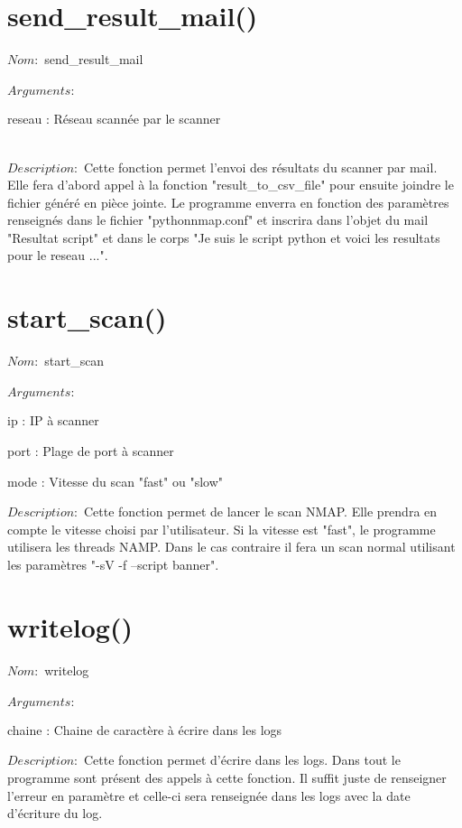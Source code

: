 \documentclass[12pt]{report}
\begin{document}
		\section{send\_result\_mail()}
			{\setlength{\parindent}{0cm}
			$Nom :$ send\_result\_mail\\\\
			}
			$Arguments :$
			\begin{description}
				\item reseau : Réseau scannée par le scanner\\\
			\end{description}
			$Description : $ Cette fonction permet l'envoi des résultats du scanner par mail. Elle fera d'abord appel à la fonction "result\_to\_csv\_file" pour ensuite joindre le fichier généré en pièce jointe. Le programme enverra en fonction des paramètres renseignés dans le fichier "pythonnmap.conf" et inscrira dans l'objet du mail "Resultat script" et dans le corps "Je suis le script python et voici les resultats pour le reseau ...".
		\section{start\_scan()}
			{\setlength{\parindent}{0cm}
			$Nom :$ start\_scan\\\\
			}
			$Arguments :$
			\begin{description}
				\item ip : IP à scanner
				\item port : Plage de port à scanner
				\item mode : Vitesse du scan "fast" ou "slow"\\
			\end{description}
			$Description : $ Cette fonction permet de lancer le scan NMAP. Elle prendra en compte le vitesse choisi par l'utilisateur. Si la vitesse est "fast", le programme utilisera les threads NAMP. Dans le cas contraire il fera un scan normal utilisant les paramètres "-sV -f --script banner".
		\section{writelog()}
			{\setlength{\parindent}{0cm}
			$Nom :$ writelog\\\\
			}
			$Arguments :$
			\begin{description}
				\item chaine : Chaine de caractère à écrire dans les logs\\
			\end{description}
			$Description : $ Cette fonction permet d'écrire dans les logs. Dans tout le programme sont présent des appels à cette fonction. Il suffit juste de renseigner l'erreur en paramètre et celle-ci sera renseignée dans les logs avec la date d'écriture du log.
\end{document}
